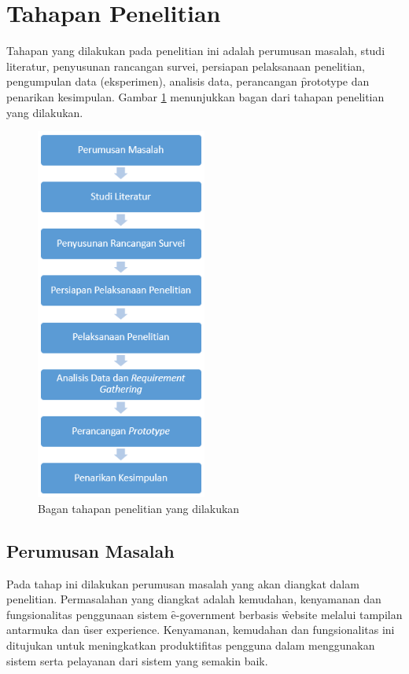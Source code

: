 \section{Tahapan Penelitian}
Tahapan yang dilakukan pada penelitian ini adalah perumusan masalah, studi literatur, penyusunan rancangan survei, persiapan pelaksanaan penelitian, pengumpulan data (eksperimen), analisis data, perancangan \f{prototype} dan penarikan kesimpulan. Gambar \ref{fig:tahapan} menunjukkan bagan dari tahapan penelitian yang dilakukan.
\begin{figure}
	\centering
	\includegraphics[width=0.5\textwidth]
	{pics/tahapan.PNG}
	\caption{Bagan tahapan penelitian yang dilakukan}
	\label{fig:tahapan}
\end{figure}
\subsection{Perumusan Masalah}
Pada tahap ini dilakukan perumusan masalah yang akan diangkat dalam penelitian. Permasalahan yang diangkat adalah kemudahan, kenyamanan dan fungsionalitas penggunaan sistem \f{e-government} berbasis \f{website} melalui tampilan antarmuka dan \f{user experience}. Kenyamanan, kemudahan dan fungsionalitas ini ditujukan untuk meningkatkan produktifitas pengguna dalam menggunakan sistem serta pelayanan dari sistem yang semakin baik.
